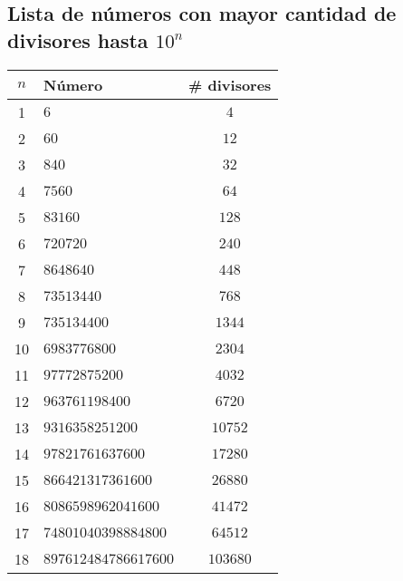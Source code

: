 \subsection{Lista de números con mayor cantidad de divisores hasta $10^n$}
\begin{center}
\begin{tabular}{|c|l|c|}
\hline
$n$ & Número & \# divisores \\ \hline
1  & $6$                      & $4$     \\ \hline
2  & $60$                     & $12$    \\ \hline
3  & $840$                    & $32$    \\ \hline
4  & $7560$                   & $64$    \\ \hline
5  & $83160$                  & $128$   \\ \hline
6  & $720720$                 & $240$   \\ \hline
7  & $8648640$                & $448$   \\ \hline
8  & $73513440$               & $768$   \\ \hline
9  & $735134400$              & $1344$  \\ \hline
10 & $6983776800$             & $2304$  \\ \hline
11 & $97772875200$            & $4032$  \\ \hline
12 & $963761198400$           & $6720$  \\ \hline
13 & $9316358251200$          & $10752$ \\ \hline
14 & $97821761637600$         & $17280$ \\ \hline
15 & $866421317361600$        & $26880$ \\ \hline
16 & $8086598962041600$       & $41472$ \\ \hline
17 & $74801040398884800$      & $64512$ \\ \hline
18 & $897612484786617600$     & $103680$\\ \hline
\end{tabular}
\end{center}
